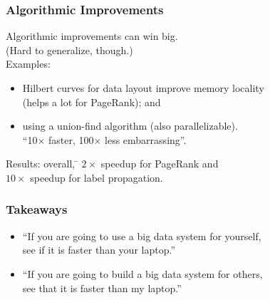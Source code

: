 \documentclass[aspectratio=43]{beamer}
\newenvironment{changemargin}[1]{%
  \begin{list}{}{%
    \setlength{\topsep}{0pt}%
    \setlength{\leftmargin}{#1}%
    \setlength{\rightmargin}{1em}
    \setlength{\listparindent}{\parindent}%
    \setlength{\itemindent}{\parindent}%
    \setlength{\parsep}{\parskip}%
  }%
  \item[]}{\end{list}}
\begin{document}
\begin{frame}
  \frametitle{Algorithmic Improvements}
  \begin{changemargin}{1cm}
Algorithmic improvements can win big.\\
(Hard to generalize, though.)\\[1em]

Examples:
\begin{itemize}
\item Hilbert curves for data layout improve memory locality\\
(helps a lot for PageRank); and
\item  using a union-find algorithm (also parallelizable).\\
 ``10$\times$ faster, 100$\times$ less embarrassing''. 
\end{itemize}

\begin{tabbing}
Results: overall, \= $2\times$ speedup for PageRank and\\
\> $10\times$ speedup for label propagation.
\end{tabbing}

  \end{changemargin}
\end{frame}

\begin{frame}
  \frametitle{Takeaways}
  \begin{changemargin}{1cm}

\begin{itemize}
\item    ``If you are going to use a big data system for yourself, \\ see if it is faster than your laptop.''
\item    ``If you are going to build a big data system for others, \\ see that it is faster than my laptop.''
\end{itemize}

  \end{changemargin}
\end{frame}

\end{document}
